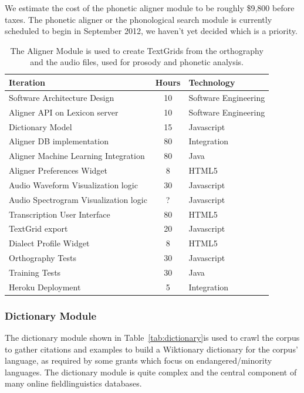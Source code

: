 \documentclass[12pt]{article}
\begin{document}
We estimate the cost of the phonetic aligner module to be roughly \$9,800 before taxes. The phonetic aligner or the phonological search module is currently scheduled to begin in September 2012, we haven't yet decided which is a priority.
\begin{table}[htbp]
\begin{center}
  \begin{tabular}{ | lcl | }
\hline

Iteration&  Hours&  Technology  \\
\hline
Software Architecture Design& 10& Software Engineering  \\ 
Aligner API on Lexicon server&  10& Software Engineering\\ 
Dictionary Model& 15& Javascript  \\ 
Aligner DB implementation&  80& Integration \\ 
Aligner Machine Learning Integration& 80& Java  \\ 
Aligner Preferences Widget& 8&  HTML5 \\ 
Audio Waveform Visualization logic& 30& Javascript  \\ 
Audio Spectrogram Visualization logic&  ?&  Javascript \\ 
Transcription User Interface& 80& HTML5 \\ 
TextGrid export&  20&  Javascript \\ 
Dialect Profile Widget&          8&  HTML5 \\ 
Orthography Tests&  30&  Javascript \\ 
Training Tests& 30& Java  \\ 
Heroku Deployment&  5&  Integration \\ 
\hline
  \end{tabular}
  \caption{The Aligner Module is used to create TextGrids from the orthography and the audio files, used for prosody and phonetic analysis.}
  \label{tab:aligner}
  \end{center}
\end{table}



\newpage
\subsubsection{Dictionary Module}

The dictionary module shown in Table~\ref{tab:dictionary}is used to crawl the corpus to gather citations and examples to build a Wiktionary dictionary for the corpus' language, as required by some grants which focus on endangered/minority languages. The dictionary module is quite complex and the central component of many online fieldlinguistics databases.   
\end{document}
